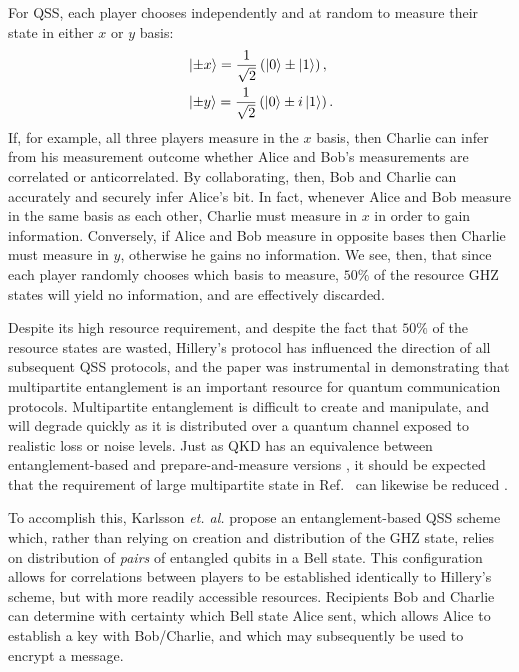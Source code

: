 For QSS, each player chooses independently and at random to measure their state in either $x$ or $y$ basis:
\begin{align}
&\ket{\pm x} = \frac{1}{\sqrt{2}} \left( \ket{0} \pm \ket{1}\right), \notag \\
%
&\ket{\pm y} = \frac{1}{\sqrt{2}} \left( \ket{0} \pm i \ket{1} \right). \notag
\end{align}
If, for example, all three players measure in the $x$ basis, then Charlie can infer from his measurement outcome whether Alice and Bob's measurements are correlated or anticorrelated. By collaborating, then, Bob and Charlie can accurately and securely infer Alice's bit. In fact, whenever Alice and Bob measure in the same basis as each other, Charlie must measure in $x$ in order to gain information. Conversely, if Alice and Bob measure in opposite bases then Charlie must measure in $y$, otherwise he gains no information. We see, then, that since each player randomly chooses which basis to measure, $50\%$ of the resource GHZ states will yield no information, and are effectively discarded.

Despite its high resource requirement, and despite the fact that $50\%$ of the resource states are wasted, Hillery's protocol has influenced the direction of all subsequent QSS protocols, and the paper was instrumental in demonstrating that multipartite entanglement is an important resource for quantum communication protocols. 
Multipartite entanglement is difficult to create and manipulate, and will degrade quickly as it is distributed over a quantum channel exposed to realistic loss or noise levels. Just as QKD has an equivalence between entanglement-based and prepare-and-measure versions \cite{Grosshans2003, Laudenbach2017}, it should be expected that the requirement of large multipartite state in Ref.~\cite{Hillery1999} can likewise be reduced \cite{Karlsson1999, Tittel2001, Zhang2005b, Williams2019}. 

To accomplish this, Karlsson \emph{et. al.} \cite{Karlsson1999} propose an entanglement-based QSS scheme which, rather than relying on creation and distribution of the GHZ state, relies on distribution of \emph{pairs} of entangled qubits in a Bell state. This configuration allows for correlations between players to be established identically to Hillery's scheme, but with more readily accessible resources. Recipients Bob and Charlie can determine with certainty which Bell state Alice sent, which allows Alice to establish a key with Bob/Charlie, and which may subsequently be used to encrypt a message. %

